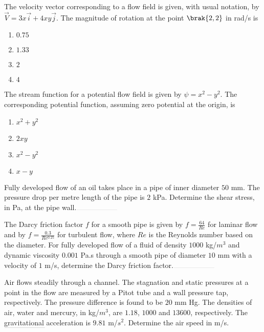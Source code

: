 \item The velocity vector corresponding to a flow field is given, with usual notation, by $\vec{V} = 3x\vec{i} + 4xy\vec{j}$. The magnitude of rotation at the point $\brak{2,2}$ in rad/s is
\hfill{}
\begin{enumerate}
\item $0.75$
\item $1.33$
\item $2$
\item $4$
\end{enumerate}

\item The stream function for a potential flow field is given by $\psi = x^2 - y^2$. The corresponding potential function, assuming zero potential at the origin, is
\hfill{}
\begin{enumerate}
\item $x^2 + y^2$
\item $2xy$
\item $x^2 - y^2$
\item $x - y$
\end{enumerate}

\item Fully developed flow of an oil takes place in a pipe of inner diameter $50$ mm. The pressure drop per metre length of the pipe is $2$ kPa. Determine the shear stress, in Pa, at the pipe wall.$\rule{2cm}{0.1pt}$
\hfill{}

\item The Darcy friction factor $f$ for a smooth pipe is given by $f = \frac{64}{Re}$ for laminar flow and by $f = \frac{0.3}{Re^{0.25}}$ for turbulent flow, where $Re$ is the Reynolds number based on the diameter. For fully developed flow of a fluid of density $1000$ kg/$m^3$ and dynamic viscosity $0.001$ Pa.s through a smooth pipe of diameter $10$ mm with a velocity of $1$ m/s, determine the Darcy friction factor.$\rule{2cm}{0.1pt}$
\hfill{}

\item Air flows steadily through a channel. The stagnation and static pressures at a point in the flow are measured by a Pitot tube and a wall pressure tap, respectively. The pressure difference is found to be $20$ mm Hg. The densities of air, water and mercury, in kg/$m^3$, are $1.18$, $1000$ and $13600$, respectively. The gravitational acceleration is $9.81$ m/$s^2$. Determine the air speed in m/s.$\rule{2cm}{0.1pt}$
\hfill{}\\

